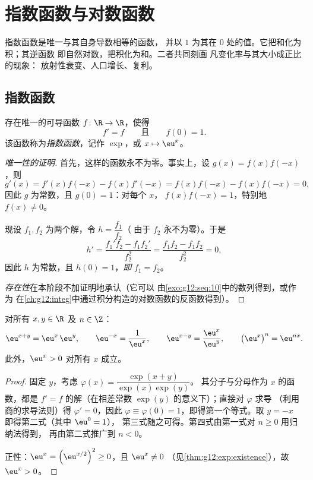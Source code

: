 \chapter{指数函数与对数函数}\label{ch:g12:exp}

指数函数是唯一与其自身导数相等的函数，
并以 $1$ 为其在 $0$ 处的值。它把和化为积；其逆函数
即自然对数，把积化为和。二者共同刻画
凡变化率与其大小成正比的现象：
放射性衰变、人口增长、复利。

\section{指数函数}

\begin{theorem}[存在性与唯一性]\label{thm:g12:exp:existence}
存在唯一的可导函数 $f \colon \R \to \R$，使得
\[
f' = f \qquad\text{且}\qquad f(0) = 1 .
\]
该函数称为\emph{指数函数}，记作
$\exp$，或 $x \mapsto \eu^x$。
\end{theorem}

\begin{proof}[唯一性的证明]
首先，这样的函数永不为零。事实上，设
$g(x) = f(x)f(-x)$，则
\[
g'(x) = f'(x)f(-x) - f(x)f'(-x) = f(x)f(-x) - f(x)f(-x) = 0,
\]
因此 $g$ 为常数，且 $g(0) = 1$：对每个 $x$，
$f(x)f(-x) = 1$，特别地 $f(x) \neq 0$。

现设 $f_1, f_2$ 为两个解，令 $h = \dfrac{f_1}{f_2}$（
由于 $f_2$ 永不为零）。于是
\[
h' = \frac{f_1' f_2 - f_1 f_2'}{f_2^2} = \frac{f_1 f_2 - f_1 f_2}{f_2^2} = 0,
\]
因此 $h$ 为常数，且 $h(0) = 1$，\emph{即} $f_1 = f_2$。

\emph{存在性}在本阶段不加证明地承认（它可以
由\cref{exo:g12:seq:10}中的数列得到，或作为
在\cref{ch:g12:integ}中通过积分构造的对数函数的反函数得到）。
\end{proof}

\begin{proposition}[函数方程]\label{prop:g12:exp:funceq}
对所有 $x, y \in \R$ 及 $n \in \Z$：
\[
\eu^{x+y} = \eu^x\,\eu^y, \qquad
\eu^{-x} = \frac{1}{\eu^x}, \qquad
\eu^{x-y} = \frac{\eu^x}{\eu^y}, \qquad
\bigl(\eu^{x}\bigr)^n = \eu^{nx}.
\]
此外，$\eu^x > 0$ 对所有 $x$ 成立。
\end{proposition}

\begin{proof}
固定 $y$，考虑 $\varphi(x) = \dfrac{\exp(x+y)}{\exp(x)\exp(y)}$。
其分子与分母作为 $x$ 的函数，都是
$f' = f$ 的解（在相差常数 $\exp(y)$ 的意义下）；直接对 $\varphi$ 求导
（利用商的求导法则）得 $\varphi' = 0$，因此
$\varphi \equiv \varphi(0) = 1$，即得第一个等式。取
$y = -x$ 即得第二式（其中 $\eu^0 = 1$），
第三式随之可得。第四式由第一式对 $n \geq 0$ 用归纳法得到，
再由第二式推广到 $n < 0$。

正性：$\eu^x = \left(\eu^{x/2}\right)^2 \geq 0$，且 $\eu^x \neq 0$
（见\cref{thm:g12:exp:existence}），故 $\eu^x > 0$。
\end{proof}

